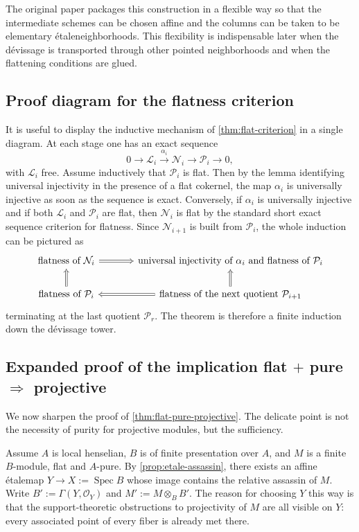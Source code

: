 \documentclass[11pt,oneside]{article}
\newcommand{\Lcal}{\mathcal L}
\newcommand{\N}{\mathcal N}
\newcommand{\Pcal}{\mathcal P}
\newcommand{\OO}{\mathcal O}
\newcommand{\Spec}{\operatorname{Spec}}
\newcommand{\etale}{\'etale}
\begin{document}
The original paper packages this construction in a flexible way so that the intermediate schemes can be chosen affine and the columns can be taken to be elementary \etale neighborhoods.  This flexibility is indispensable later when the d\'evissage is transported through other pointed neighborhoods and when the flattening conditions are glued.

\subsection{Proof diagram for the flatness criterion}

It is useful to display the inductive mechanism of \cref{thm:flat-criterion} in a single diagram.  At each stage one has an exact sequence
\[
0\to \Lcal_i\xrightarrow{\alpha_i}\N_i\to \Pcal_i\to 0,
\]
with $\Lcal_i$ free.  Assume inductively that $\Pcal_i$ is flat.  Then by the lemma identifying universal injectivity in the presence of a flat cokernel, the map $\alpha_i$ is universally injective as soon as the sequence is exact.  Conversely, if $\alpha_i$ is universally injective and if both $\Lcal_i$ and $\Pcal_i$ are flat, then $\N_i$ is flat by the standard short exact sequence criterion for flatness.  Since $\N_{i+1}$ is built from $\Pcal_i$, the whole induction can be pictured as
\[
\begin{tikzcd}[column sep=large]
\text{flatness of }\N_i \ar[r,Rightarrow] & \text{universal injectivity of }\alpha_i \text{ and flatness of }\Pcal_i \\
\text{flatness of }\Pcal_i \ar[u,Rightarrow] & \text{flatness of the next quotient }\Pcal_{i+1} \ar[l,Rightarrow] \ar[u,Rightarrow]
\end{tikzcd}
\]
terminating at the last quotient $\Pcal_r$.  The theorem is therefore a finite induction down the d\'evissage tower.

\subsection{Expanded proof of the implication flat $+$ pure $\Rightarrow$ projective}

We now sharpen the proof of \cref{thm:flat-pure-projective}.  The delicate point is not the necessity of purity for projective modules, but the sufficiency.

Assume $A$ is local henselian, $B$ is of finite presentation over $A$, and $M$ is a finite $B$-module, flat and $A$-pure.  By \cref{prop:etale-assassin}, there exists an affine \etale map $Y\to X:=\Spec B$ whose image contains the relative assassin of $M$.  Write $B':=\Gamma(Y,\OO_Y)$ and $M':=M\otimes_B B'$.  The reason for choosing $Y$ this way is that the support-theoretic obstructions to projectivity of $M$ are all visible on $Y$: every associated point of every fiber is already met there.
\end{document}
